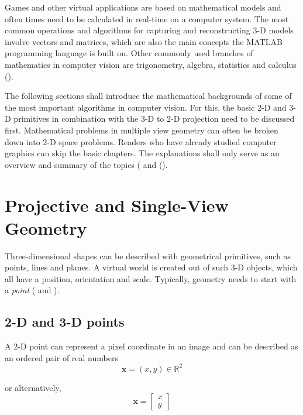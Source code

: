 Games and other virtual applications are based on mathematical models and often times need to be calculated in real-time on a computer system. The most common operations and algorithms for capturing and reconstructing 3-D models involve vectors and matrices, which are also the main concepts the MATLAB programming language is built on. Other commonly used branches of mathematics in computer vision are trigonometry, algebra, statistics and calculus (\cite[p.165]{Gregory.2014}).

The following sections shall introduce the mathematical backgrounds of some of the most important algorithms in computer vision. For this, the basic 2-D and 3-D primitives in combination with the 3-D to 2-D projection need to be discussed first. Mathematical problems in multiple view geometry can often be broken down into 2-D space problems. Readers who have already studied computer graphics can skip the basic chapters. The explanations shall only serve as an overview and summary of the topics (\cite[p.29]{Szeliski.2011} and (\cite[p.165 et seq.]{Gregory.2014}).

\section{Projective and Single-View Geometry}
Three-dimensional shapes can be described with geometrical primitives, such as points, lines and planes. A virtual world is created out of such 3-D objects, which all have a position, orientation and scale. Typically, geometry needs to start with a \textit{point} (\cite[p.29 et seqq.]{Szeliski.2011} and \cite[p.166 et seqq.]{Gregory.2014}).

\subsection{2-D and 3-D points}\label{ssec:Points}
A 2-D point can represent a pixel coordinate in an image and can be described as an ordered pair of real numbers 
\begin{equation}
\mathbf{x} = (x,y)\in \mathbb{R}^2
\end{equation}

or alternatively, 
\begin{equation} 
\mathbf{x}=
  \begin{bmatrix}
   x \\
   y
  \end{bmatrix}
\end{equation}

